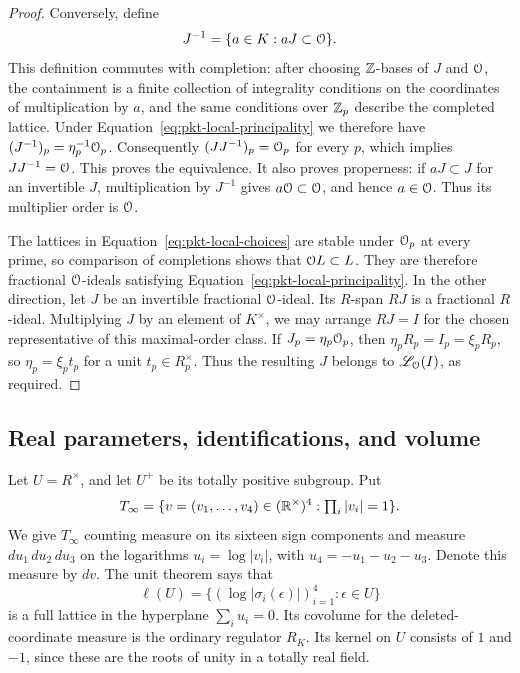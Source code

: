 \begin{proof}
Conversely, define
\[
 J^{-1}=\{a\in K:aJ\subset\mathcal O\}.
\]
This definition commutes with completion: after choosing \(\mathbb Z\)-bases
of \(J\) and \(\mathcal O\), the containment is a finite collection of
integrality conditions on the coordinates of multiplication by \(a\),
and the same conditions over \(\mathbb Z_p\) describe the completed lattice.
Under Equation~\eqref{eq:pkt-local-principality} we therefore have
\((J^{-1})_p=\eta_p^{-1}\mathcal O_p\).  Consequently
\((JJ^{-1})_p=\mathcal O_p\) for every \(p\), which implies \(JJ^{-1}=\mathcal O\).
This proves the equivalence.  It also proves properness: if \(aJ\subset J\)
for an invertible \(J\), multiplication by \(J^{-1}\) gives
\(a\mathcal O\subset\mathcal O\), and hence \(a\in\mathcal O\).  Thus its multiplier order
is \(\mathcal O\).

The lattices in Equation~\eqref{eq:pkt-local-choices} are stable under
\(\mathcal O_p\) at every prime, so comparison of completions shows that
\(\mathcal O L\subset L\).  They are therefore fractional \(\mathcal O\)-ideals
satisfying Equation~\eqref{eq:pkt-local-principality}.  In the other
direction, let \(J\) be an invertible fractional \(\mathcal O\)-ideal.  Its \(R\)-span
\(RJ\) is a fractional \(R\)-ideal.  Multiplying \(J\) by an element
of \(K^\times\), we may arrange \(RJ=I\) for the chosen representative
of this maximal-order class.  If \(J_p=\eta_p\mathcal O_p\), then
\(\eta_p R_p=I_p=\xi_pR_p\), so \(\eta_p=\xi_p t_p\) for a unit
\(t_p\in R_p^\times\).  Thus the resulting \(J\) belongs to
\(\mathscr L_{\mathcal O}(I)\), as required.
\end{proof}

\subsection{Real parameters, identifications, and volume}

Let \(U=R^\times\), and let \(U^+\) be its totally positive subgroup.
Put
\[
 T_\infty=\{v=(v_1,\ldots,v_4)\in(\mathbb R^\times)^4:
                         \textstyle\prod_i|v_i|=1\}.
\]
We give \(T_\infty\) counting measure on its sixteen sign components
and measure \(du_1\,du_2\,du_3\) on the logarithms
\(u_i=\log|v_i|\), with \(u_4=-u_1-u_2-u_3\).  Denote this measure
by \(dv\).  The unit theorem
\cite[Theorems~5.1 and~5.9]{MilneANT} says that
\[
 \ell(U)=\{(\log|\sigma_i(\epsilon)|)_{i=1}^4:\epsilon\in U\}
\]
is a full lattice in the hyperplane \(\sum_i u_i=0\).  Its
covolume for the deleted-coordinate measure is the ordinary regulator
\(R_K\).  Its kernel on \(U\) consists of \(1\) and \(-1\), since
these are the roots of unity in a totally real field.

